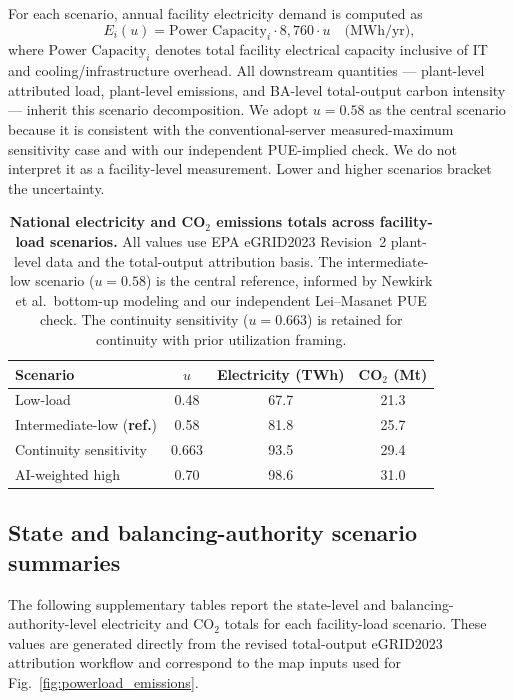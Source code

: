 \documentclass[12pt]{article}
\begin{document}
\noindent For each scenario, annual facility electricity demand is computed
as
\begin{equation}
\label{eq:dc_load}
E_i(u) = \text{Power Capacity}_i \cdot 8{,}760 \cdot u \quad \text{(MWh/yr)},
\end{equation}
where $\text{Power Capacity}_i$ denotes total facility electrical capacity
inclusive of IT and cooling/infrastructure overhead. All downstream
quantities --- plant-level attributed load, plant-level emissions, and
BA-level total-output carbon intensity --- inherit this scenario decomposition.
We adopt $u = 0.58$ as the central scenario because it is consistent with the conventional-server measured-maximum sensitivity case and with our independent PUE-implied check. We do not interpret it as a facility-level measurement. Lower and higher scenarios bracket the uncertainty.

\begin{table}[H]
\centering
\caption{\textbf{National electricity and CO$_2$ emissions totals across
facility-load scenarios.} All values use EPA eGRID2023 Revision~2 plant-level data and the total-output attribution basis.
The intermediate-low scenario ($u = 0.58$) is the central reference,
informed by Newkirk et al.\ bottom-up modeling and our independent
Lei--Masanet PUE check. The continuity sensitivity ($u = 0.663$) is retained
for continuity with prior utilization framing.}
\label{tab:utilization_scenarios}
\begin{tabular}{lccc}
\toprule
Scenario & $u$ & Electricity (TWh) & CO$_2$ (Mt) \\
\midrule
Low-load                       & 0.48  & 67.7 & 21.3 \\
Intermediate-low (\textbf{ref.}) & 0.58  & 81.8 & 25.7 \\
Continuity sensitivity         & 0.663 & 93.5 & 29.4 \\
AI-weighted high               & 0.70  & 98.6 & 31.0 \\
\bottomrule
\end{tabular}
\end{table}

\subsection{State and balancing-authority scenario summaries}

The following supplementary tables report the state-level and balancing-authority-level electricity and CO$_2$ totals for each facility-load scenario. These values are generated directly from the revised total-output eGRID2023 attribution workflow and correspond to the map inputs used for Fig.~\ref{fig:powerload_emissions}.
\end{document}
